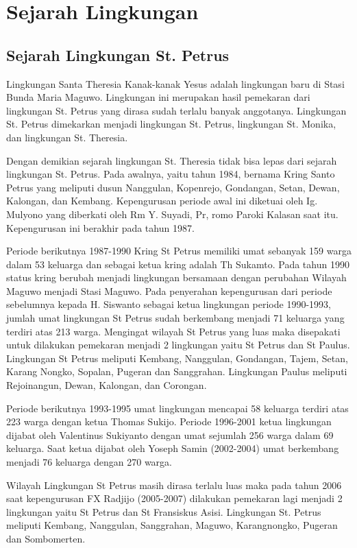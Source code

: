 \chapter{Sejarah Lingkungan}
\section{Sejarah Lingkungan St. Petrus}
\small
Lingkungan Santa Theresia Kanak-kanak Yesus adalah lingkungan baru di Stasi Bunda Maria Maguwo. Lingkungan ini merupakan hasil pemekaran dari lingkungan St. Petrus yang dirasa sudah terlalu banyak anggotanya. Lingkungan St. Petrus dimekarkan menjadi lingkungan St. Petrus, lingkungan St. Monika, dan lingkungan St. Theresia.

Dengan demikian sejarah lingkungan St. Theresia tidak bisa lepas dari sejarah lingkungan St. Petrus. 
Pada awalnya, yaitu tahun 1984, bernama Kring Santo
Petrus yang meliputi dusun Nanggulan, Kopenrejo, Gondangan, Setan,
Dewan, Kalongan, dan Kembang. Kepengurusan periode awal ini diketuai
oleh Ig. Mulyono yang diberkati oleh Rm Y. Suyadi, Pr, romo Paroki
Kalasan saat itu. Kepengurusan ini berakhir pada tahun 1987.

Periode berikutnya 1987-1990 Kring St Petrus memiliki umat sebanyak 159
warga dalam 53 keluarga dan sebagai ketua kring adalah Th Sukamto. Pada
tahun 1990 status kring berubah menjadi lingkungan bersamaan dengan
perubahan Wilayah Maguwo menjadi Stasi Maguwo. Pada penyerahan
kepengurusan dari periode sebelumnya kepada H. Siswanto sebagai ketua
lingkungan periode 1990-1993, jumlah umat lingkungan St Petrus sudah
berkembang menjadi 71 keluarga yang terdiri atas 213 warga. Mengingat
wilayah St Petrus yang luas maka disepakati untuk dilakukan pemekaran
menjadi 2 lingkungan yaitu St Petrus dan St Paulus. Lingkungan St
Petrus meliputi Kembang, Nanggulan, Gondangan, Tajem, Setan, Karang
Nongko, Sopalan, Pugeran dan Sanggrahan. Lingkungan Paulus meliputi
Rejoinangun, Dewan, Kalongan, dan Corongan.

Periode berikutnya 1993-1995 umat lingkungan mencapai 58 keluarga
terdiri atas 223 warga dengan ketua Thomas Sukijo. Periode 1996-2001
ketua lingkungan dijabat oleh Valentinus Sukiyanto dengan umat sejumlah
256 warga dalam 69 keluarga. Saat ketua dijabat oleh Yoseph Samin
(2002-2004) umat berkembang menjadi 76 keluarga dengan 270 warga.

Wilayah Lingkungan St Petrus masih dirasa terlalu luas maka pada tahun
2006 saat kepengurusan FX Radjijo (2005-2007) dilakukan pemekaran lagi
menjadi 2 lingkungan yaitu St Petrus dan St Fransiskus Asisi.
Lingkungan St. Petrus meliputi Kembang, Nanggulan, Sanggrahan, Maguwo,
Karangnongko, Pugeran dan Sombomerten. 

